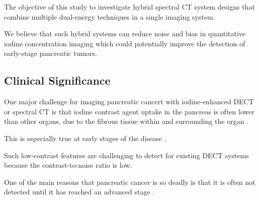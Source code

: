 \documentclass[12pt]{article}
\begin{document}
The objective of this study to investigate hybrid spectral CT system designs that combine multiple dual-energy techniques in a single imaging system.


We believe that such hybrid systems can reduce noise and bias in quantitative iodine concentration imaging which could potentially improve the detection of early-stage pancreatic tumors.

\subsection{Clinical Significance}
\label{subsec:intro_clinical}





One major challenge for imaging pancreatic cancert with iodine-enhanced DECT or spectral CT is that iodine contrast agent uptake in the pancreas is often lower than other organs, due to the fibrous tissue within and surrounding the organ \cite{Johnson2017}.

This is especially true at early stages of the disease \cite{Johnson2017}.


Such low-contrast features are challenging to detect for existing DECT systems because the contrast-to-noise ratio is low. 


One of the main reasons that pancreatic cancer is so deadly is that it is often not detected until it has reached an advanced stage \cite{Siegel2019}.

\end{document}
